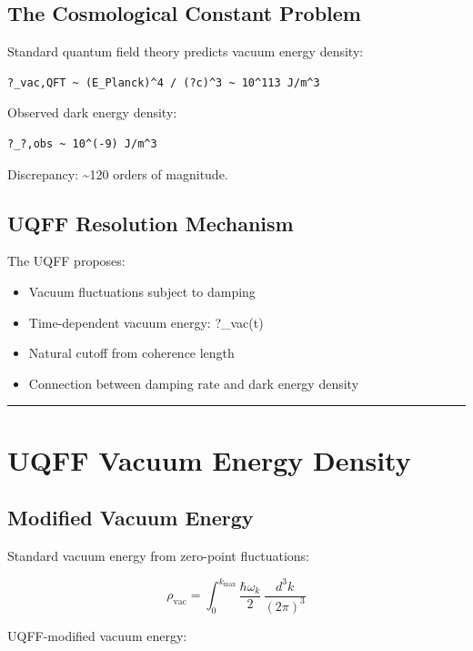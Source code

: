 \documentclass[12pt,a4paper]{article}
\begin{document}
\subsection{The Cosmological Constant Problem}

Standard quantum field theory predicts vacuum energy density:

\begin{verbatim}
?_vac,QFT ~ (E_Planck)^4 / (?c)^3 ~ 10^113 J/m^3
\end{verbatim}

Observed dark energy density:

\begin{verbatim}
?_?,obs ~ 10^(-9) J/m^3
\end{verbatim}

Discrepancy: \textasciitilde{}120 orders of magnitude.

\subsection{UQFF Resolution Mechanism}

The UQFF proposes:

\begin{itemize}
  \item Vacuum fluctuations subject to damping
  \item Time-dependent vacuum energy: ?\_vac(t)
  \item Natural cutoff from coherence length
  \item Connection between damping rate and dark energy density
\end{itemize}

\medskip\hrule\medskip

\section{UQFF Vacuum Energy Density}

\subsection{Modified Vacuum Energy}

Standard vacuum energy from zero-point fluctuations:

\begin{equation}
\rho_{\mathrm{vac}} = \int_0^{k_{\max}} \frac{\hbar\omega_k}{2}\,\frac{d^3k}{(2\pi)^3}
\end{equation}

UQFF-modified vacuum energy:
\end{document}
